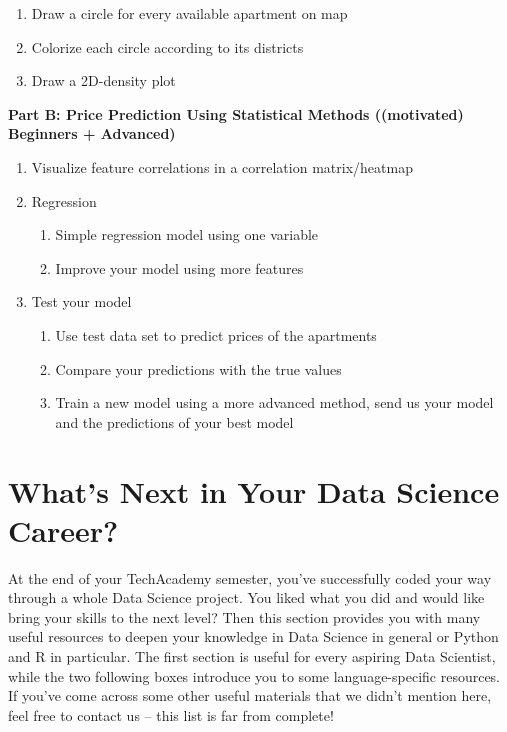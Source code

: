\documentclass[
  11pt,
]{book}
\begin{document}
\begin{enumerate}
  \begin{enumerate}
  \def\labelenumii{\alph{enumii}.}
  \item
    Draw a circle for every available apartment on map
  \item
    Colorize each circle according to its districts
  \item
    Draw a 2D-density plot
  \end{enumerate}
\end{enumerate}

\textbf{Part B: Price Prediction Using Statistical Methods ((motivated)
Beginners + Advanced)}

\begin{enumerate}
\def\labelenumi{\arabic{enumi}.}
\item
  Visualize feature correlations in a correlation matrix/heatmap
\item
  Regression

  \begin{enumerate}
  \def\labelenumii{\alph{enumii}.}
  \item
    Simple regression model using one variable
  \item
    Improve your model using more features
  \end{enumerate}
\item
  Test your model

  \begin{enumerate}
  \def\labelenumii{\alph{enumii}.}
  \item
    Use test data set to predict prices of the apartments
  \item
    Compare your predictions with the true values
  \item
    Train a new model using a more advanced method, send us your model
    and the predictions of your best model
  \end{enumerate}
\end{enumerate}

\newpage

\hypertarget{whats-next-in-your-data-science-career}{%
\chapter{What's Next in Your Data Science
Career?}\label{whats-next-in-your-data-science-career}}

At the end of your TechAcademy semester, you've successfully coded your
way through a whole Data Science project. You liked what you did and
would like bring your skills to the next level? Then this section
provides you with many useful resources to deepen your knowledge in Data
Science in general or Python and R in particular. The first section is
useful for every aspiring Data Scientist, while the two following boxes
introduce you to some language-specific resources. If you've come across
some other useful materials that we didn't mention here, feel free to
contact us -- this list is far from complete!
\end{document}
